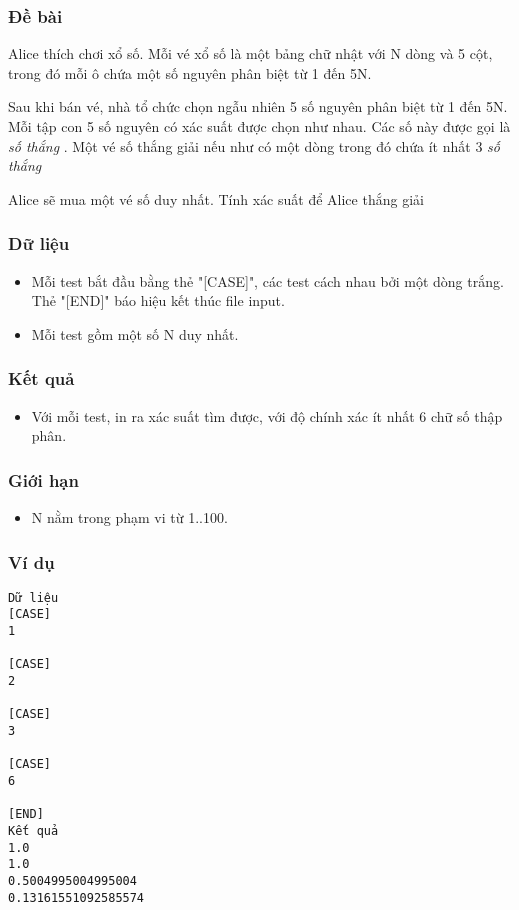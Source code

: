 



\subsubsection{   Đề bài  }

   Alice thích chơi xổ số. Mỗi vé xổ số là một bảng chữ nhật với N dòng và 5 cột, trong đó mỗi ô chứa một số nguyên phân biệt từ 1 đến 5N.  

   Sau khi bán vé, nhà tổ chức chọn ngẫu nhiên 5 số nguyên phân biệt từ 1 đến 5N. Mỗi tập con 5 số nguyên có xác suất được chọn như nhau. Các số này được gọi là   \emph{    số thắng   }   . Một vé số thắng giải nếu như có một dòng trong đó chứa ít nhất 3   \emph{    số thắng   }

   Alice sẽ mua một vé số duy nhất. Tính xác suất để Alice thắng giải  

\subsubsection{   Dữ liệu  }
\begin{itemize}
	\item     Mỗi test bắt đầu bằng thẻ "[CASE]", các test cách nhau bởi một dòng trắng. Thẻ "[END]" báo hiệu kết thúc file input.   
	\item     Mỗi test gồm một số N duy nhất.   
\end{itemize}

\subsubsection{   Kết quả  }
\begin{itemize}
	\item     Với mỗi test, in ra xác suất tìm được, với độ chính xác ít nhất 6 chữ số thập phân.   
\end{itemize}

\subsubsection{   Giới hạn  }
\begin{itemize}
	\item     N nằm trong phạm vi từ 1..100.   
\end{itemize}

\subsubsection{   Ví dụ  }
\begin{verbatim}
Dữ liệu
[CASE]
1

[CASE]
2

[CASE]
3

[CASE]
6

[END]
Kết quả
1.0
1.0
0.5004995004995004
0.13161551092585574
\end{verbatim}
